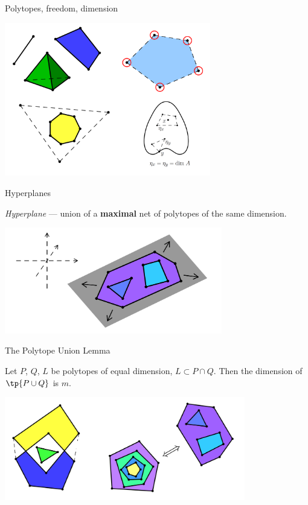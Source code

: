 \documentclass[12pt]{beamer}
\begin{document}
\newpage

\begin{frame}{Polytopes, freedom, dimension}
    \centering

    \includegraphics[width=9cm]{5.png}
\end{frame}

\newpage

\begin{frame}{Hyperplanes}
    \begin{definition}
        \textit{Hyperplane} --- union of a \textbf{maximal} net of polytopes of the same dimension.
    \end{definition}
    
    \centering

    \includegraphics[width = 9.5cm]{7.png}
\end{frame}

\newpage

\begin{frame}{The Polytope Union Lemma}
    \begin{lemma}
        Let \(P\), \(Q\), \(L\) be polytopes of equal dimension, \(L \subset P \cap Q\). Then the dimension of \(\tp{P \cup Q}\) is \(m\).
    \end{lemma}

    \centering

    \includegraphics[width = 10.5cm]{8.png}
\end{frame}
\end{document}
